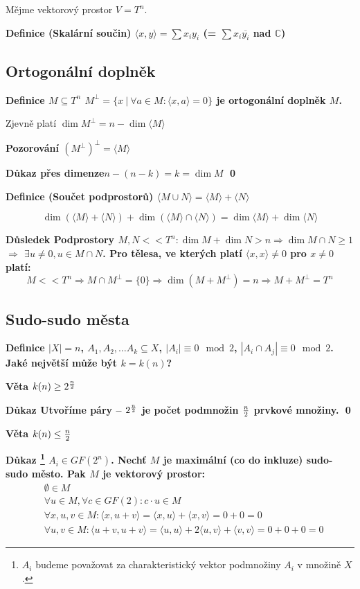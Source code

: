 \documentclass[a4paper,12pt,titlepage]{article}
\newcommand{\dk}{\smallskip\noindent\bf Důkaz\rm{} }
\newcommand{\df}{\smallskip\noindent\bf Definice\rm{} }
\newcommand{\vt}{\smallskip\noindent\bf Věta\rm{} }
\newcommand{\poz}{\smallskip\noindent\bf Pozorování\rm{} }
\newcommand{\dsl}{\smallskip\noindent\bf Důsledek\rm{} }
\newcommand{\C}{\mathbb{C}}
\newcommand{\sk}[1]{\langle #1\rangle}
\begin{document}
Mějme vektorový prostor $V = T^n$.

\df (Skalární součin) $\sk{x,y} = \sum x_iy_i$ \quad(= $\sum x_i\overline{y_i}$ nad $\C$)

\subsection{Ortogonální doplněk}

\df $M \subseteq T^n$ \quad $M^\bot = \{x\ |\ \forall a\in M: \sk{x,a} = 0\}$ je ortogonální doplněk $M$.

Zjevně platí $\dim M^\bot = n - \dim \sk M$

\poz ${(M^\bot)}^\bot = \sk M$

\dk přes dimenze\quad $n-(n-k) = k = \dim M$ \qed

\df (Součet podprostorů) $\sk{M\cup N} = \sk M + \sk N$

$$\dim\left(\sk M + \sk N\right) + \dim\left(\sk M \cap \sk N\right) = \dim \sk M + \dim \sk N$$

\dsl Podprostory $M,N << T^n: \dim M + \dim N > n \Rightarrow \dim M \cap N \ge 1$ $\Rightarrow$ $\exists u \neq 0, u \in M\cap N$.
Pro tělesa, ve kterých platí $\sk{x,x} \neq 0$ pro $x\neq 0$ platí:
$$M << T^n \Rightarrow M\cap M^\bot = \{0\} \Rightarrow \dim(M+M^\bot) = n \Rightarrow M + M^\bot = T^n$$

\subsection{Sudo-sudo města}

\df $|X| = n$, $A_1, A_2, \dots A_k \subseteq X$, $|A_i| \equiv 0 \mod 2$, $|A_i\cap A_j| \equiv 0 \mod 2$. Jaké největší může být $k = k(n)$?

\vt $k(n) \ge 2^{n\over 2}$

\dk Utvoříme páry -- $2^{n\over 2}$ je počet podmnožin $n\over 2$ prvkové množiny. \qed

\vt $k(n) \le {n\over 2}$

\dk\footnote{$A_i$ budeme považovat za charakteristický vektor podmnožiny $A_i$
v množině $X$.} $A_i \in GF(2^n)$. Nechť $M$ je maximální (co do inkluze)
sudo-sudo město. Pak $M$ je vektorový prostor:
\begin{align}
	&\emptyset \in M \\
	&\forall u \in M, \forall c\in GF(2): c\cdot u \in M \\
	&\forall x,u,v\in M: \sk{x, u+v} = \sk{x,u} + \sk{x,v} = 0 + 0 = 0 \\
	&\forall u,v \in M: \sk{u+v,u+v} = \sk{u,u} + 2\sk{u,v} + \sk{v,v} = 0 + 0 + 0 = 0
\end{align}
\end{document}
